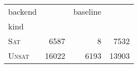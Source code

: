 \begin{tabular}{lrrr}
\toprule
backend & \Calculus{} & baseline & \Nuxmv{} \\
kind &  &  &  \\
\midrule
\textsc{Sat} & 6587 & 8 & 7532 \\
\textsc{Unsat} & 16022 & 6193 & 13903 \\
\bottomrule
\end{tabular}
